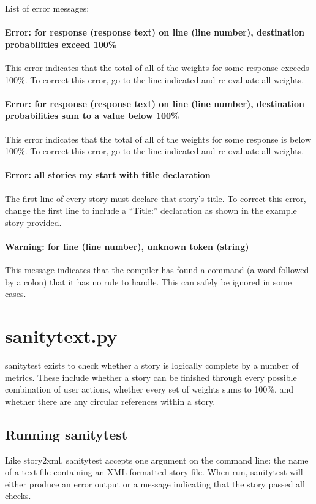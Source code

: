 \documentclass[12pt,letterpaper]{article}
\begin{document}
 List of error messages:
 \paragraph{Error: for response (response text) on line (line number), destination probabilities exceed 100\%}
 This error indicates that the total of all of the weights for some response exceeds 100\%. To correct this error, go to the line indicated and re-evaluate all weights.
 \paragraph{Error: for response (response text) on line (line number), destination probabilities sum to a value below 100\%}
 This error indicates that the total of all of the weights for some response is below 100\%. To correct this error, go to the line indicated and re-evaluate all weights.
 \paragraph{Error: all stories my start with title declaration}
 The first line of every story must declare that story's title. To correct this error, change the first line to include a ``Title:'' declaration as shown
 in the example story provided.
 \paragraph{Warning: for line (line number), unknown token (string)}
 This message indicates that the compiler has found a command (a word followed by a colon) that it has no rule to handle. This can safely be ignored in some cases.

 
 \section{sanitytext.py}
 sanitytest exists to check whether a story is logically complete by a number of metrics. These include whether a story can be finished through every possible
 combination of user actions, whether every set of weights sums to 100\%, and whether there are any circular references within a story. 
 
 \subsection{Running sanitytest}
 Like story2xml, sanitytest accepts one argument on the command line: the name of a text file containing an XML-formatted story file.
 When run, sanitytest will either produce an error output or a message indicating that the story passed all checks.
 
\end{document}
